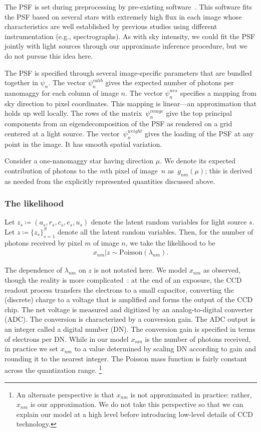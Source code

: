 The PSF is set during preprocessing by pre-existing software~\citep{lupton2001sdss}. This software fits the PSF based on several stars with extremely high flux in each image whose characteristics are well established by previous studies using different instrumentation (e.g., spectrographs).
As with sky intensity, we could fit the PSF jointly with light sources through our approximate inference procedure, but we do not pursue this idea here.

The PSF is specified through several image-specific parameters that are bundled together in $\psi_n$.
The vector $\psi_n^{calib}$ gives the expected number of photons per nanomaggy for each column of image $n$.
The vector $\psi_n^{wcs}$ specifies a mapping from sky direction to pixel coordinates. This mapping is linear---an approximation that holds up well locally.
The rows of the matrix~$\psi_n^{image}$ give the top principal components from an eigendecomposition of the PSF as rendered on a grid centered at a light source.
The vector~$\psi_n^{weight}$ gives the loading of the PSF at any point in the image. It has smooth spatial variation.

Consider a one-nanomaggy star having direction $\mu$.
We denote its expected contribution of photons to the $m$th pixel of image~$n$ as~$g_{nm}(\mu)$; this is derived as needed from the explicitly represented quantities discussed above.


\subsubsection{The likelihood}

Let $z_s \coloneqq (a_s, r_s, c_s, e_s, u_s)$ denote the latent random variables for light source $s$.
Let $z \coloneqq \{z_s\}_{s=1}^S$ denote all the latent random variables.
Then, for the number of photons received by pixel $m$ of image $n$, we take the likelihood to be
\begin{align}
x_{nm} | z \sim \mathrm{Poisson}(\lambda_{nm}).
\label{xnm}
\end{align}

The dependence of $\lambda_{nm}$ on $z$ is not notated here.
We model $x_{nm}$ as observed, though the reality is more complicated~\citep{frame}:
at the end of an exposure, the CCD readout process transfers the electrons to a small capacitor, converting the (discrete) charge to a voltage that is amplified and forms the output of the CCD chip.
The net voltage is measured and digitized by an analog-to-digital converter (ADC).
The conversion is characterized by a conversion gain.
The ADC output is an integer called a digital number (DN).
The conversion gain is specified in terms of electrons per DN.
While in our model $x_{nm}$ is the number of photons received, in practice we set $x_{nm}$ to a value determined by scaling DN according to gain and rounding it to the nearest integer.
The Poisson mass function is fairly constant across the quantization range.
\footnote{An alternate perspective is that $x_{nm}$ is not approximated in practice: rather, $x_{nm}$ is our approximation.
We do not take this perspective so that we can explain our model at a high level before introducing low-level details of CCD technology.
}

